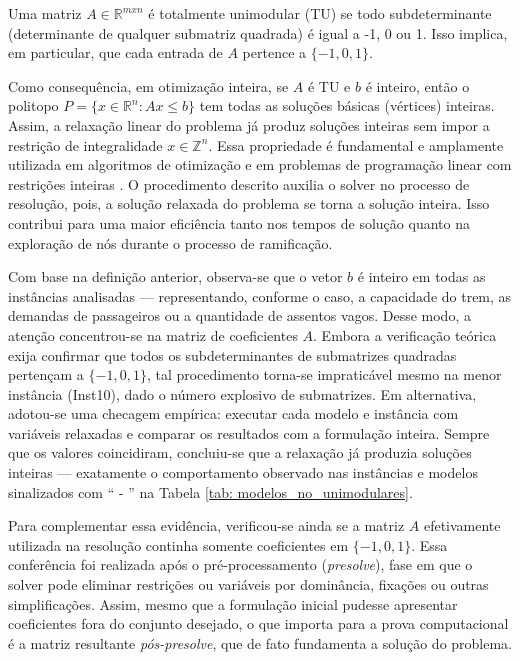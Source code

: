 Uma matriz $ A \in \mathbb{R}^{mxn}$ é totalmente unimodular (TU) se todo subdeterminante (determinante de qualquer submatriz quadrada) é igual a -1, 0 ou 1. Isso implica, em particular, que cada entrada de $A$ pertence a $\{-1,0,1\}$. 

Como consequência, em otimização inteira, se $A$ é TU e $b$ é inteiro, então o politopo $P=\{x\in \mathbb{R}^n: Ax \leq  b\}$  tem todas as soluções básicas (vértices) inteiras. Assim, a relaxação linear do problema já produz soluções inteiras sem impor a restrição de integralidade $x \in \mathbb{Z}^n$. Essa propriedade é fundamental e amplamente utilizada em algoritmos de otimização e em problemas de programação linear com restrições inteiras \citep{Samsul2018}. O procedimento descrito auxilia o solver no processo de resolução, pois, a solução relaxada do problema se torna a solução inteira. Isso contribui para uma maior eficiência tanto nos tempos de solução quanto na exploração de nós durante o processo de ramificação.

Com base na definição anterior, observa-se que o vetor $b$ é inteiro em todas as instâncias analisadas — representando, conforme o caso, a capacidade do trem, as demandas de passageiros ou a quantidade de assentos vagos. Desse modo, a atenção concentrou-se na matriz de coeficientes $A$. Embora a verificação teórica exija confirmar que todos os subdeterminantes de submatrizes quadradas pertençam a $\{-1,0,1\}$, tal procedimento torna-se impraticável mesmo na menor instância (Inst10), dado o número explosivo de submatrizes. Em alternativa, adotou-se uma checagem empírica: executar cada modelo e instância com variáveis relaxadas e comparar os resultados com a formulação inteira. Sempre que os valores coincidiram, concluiu-se que a relaxação já produzia soluções inteiras — exatamente o comportamento observado nas instâncias e modelos sinalizados com `` - '' na Tabela \ref{tab: modelos_no_unimodulares}.

Para complementar essa evidência, verificou-se ainda se a matriz $A$ efetivamente utilizada na resolução continha somente coeficientes em $\{-1,0,1\}$. Essa conferência foi realizada após o pré-processamento (\textit{presolve}), fase em que o solver pode eliminar restrições ou variáveis por dominância, fixações ou outras simplificações. Assim, mesmo que a formulação inicial pudesse apresentar coeficientes fora do conjunto desejado, o que importa para a prova computacional é a matriz resultante \textit{pós-presolve}, que de fato fundamenta a solução do problema.

